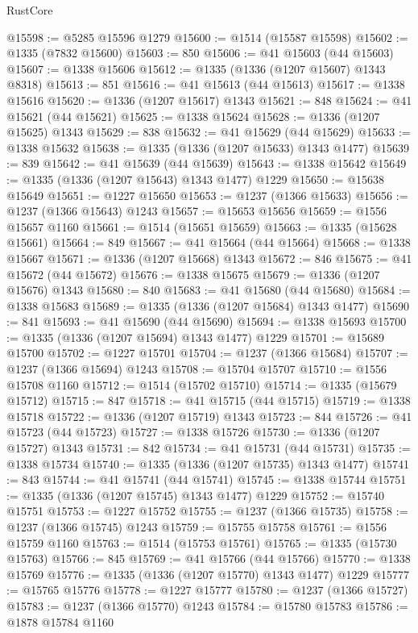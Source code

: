 \begin{lexlean}{RustCore}
\begin{coremodule}
@15598 := @5285 @15596 @1279
@15600 := @1514 (@15587 @15598)
@15602 := @1335 (@7832 @15600)
@15603 := 850
@15606 := @41 @15603 (@44 @15603)
@15607 := @1338 @15606
@15612 := @1335 (@1336 (@1207 @15607) @1343 @8318)
@15613 := 851
@15616 := @41 @15613 (@44 @15613)
@15617 := @1338 @15616
@15620 := @1336 (@1207 @15617) @1343
@15621 := 848
@15624 := @41 @15621 (@44 @15621)
@15625 := @1338 @15624
@15628 := @1336 (@1207 @15625) @1343
@15629 := 838
@15632 := @41 @15629 (@44 @15629)
@15633 := @1338 @15632
@15638 := @1335 (@1336 (@1207 @15633) @1343 @1477)
@15639 := 839
@15642 := @41 @15639 (@44 @15639)
@15643 := @1338 @15642
@15649 := @1335 (@1336 (@1207 @15643) @1343 @1477) @1229
@15650 := @15638 @15649
@15651 := @1227 @15650
@15653 := @1237 (@1366 @15633)
@15656 := @1237 (@1366 @15643) @1243
@15657 := @15653 @15656
@15659 := @1556 @15657 @1160
@15661 := @1514 (@15651 @15659)
@15663 := @1335 (@15628 @15661)
@15664 := 849
@15667 := @41 @15664 (@44 @15664)
@15668 := @1338 @15667
@15671 := @1336 (@1207 @15668) @1343
@15672 := 846
@15675 := @41 @15672 (@44 @15672)
@15676 := @1338 @15675
@15679 := @1336 (@1207 @15676) @1343
@15680 := 840
@15683 := @41 @15680 (@44 @15680)
@15684 := @1338 @15683
@15689 := @1335 (@1336 (@1207 @15684) @1343 @1477)
@15690 := 841
@15693 := @41 @15690 (@44 @15690)
@15694 := @1338 @15693
@15700 := @1335 (@1336 (@1207 @15694) @1343 @1477) @1229
@15701 := @15689 @15700
@15702 := @1227 @15701
@15704 := @1237 (@1366 @15684)
@15707 := @1237 (@1366 @15694) @1243
@15708 := @15704 @15707
@15710 := @1556 @15708 @1160
@15712 := @1514 (@15702 @15710)
@15714 := @1335 (@15679 @15712)
@15715 := 847
@15718 := @41 @15715 (@44 @15715)
@15719 := @1338 @15718
@15722 := @1336 (@1207 @15719) @1343
@15723 := 844
@15726 := @41 @15723 (@44 @15723)
@15727 := @1338 @15726
@15730 := @1336 (@1207 @15727) @1343
@15731 := 842
@15734 := @41 @15731 (@44 @15731)
@15735 := @1338 @15734
@15740 := @1335 (@1336 (@1207 @15735) @1343 @1477)
@15741 := 843
@15744 := @41 @15741 (@44 @15741)
@15745 := @1338 @15744
@15751 := @1335 (@1336 (@1207 @15745) @1343 @1477) @1229
@15752 := @15740 @15751
@15753 := @1227 @15752
@15755 := @1237 (@1366 @15735)
@15758 := @1237 (@1366 @15745) @1243
@15759 := @15755 @15758
@15761 := @1556 @15759 @1160
@15763 := @1514 (@15753 @15761)
@15765 := @1335 (@15730 @15763)
@15766 := 845
@15769 := @41 @15766 (@44 @15766)
@15770 := @1338 @15769
@15776 := @1335 (@1336 (@1207 @15770) @1343 @1477) @1229
@15777 := @15765 @15776
@15778 := @1227 @15777
@15780 := @1237 (@1366 @15727)
@15783 := @1237 (@1366 @15770) @1243
@15784 := @15780 @15783
@15786 := @1878 @15784 @1160

\end{coremodule}
\end{lexlean}
